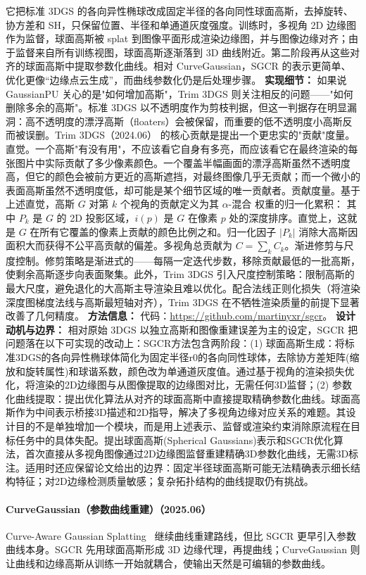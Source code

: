 它把标准 3DGS 的各向异性椭球改成固定半径的各向同性球面高斯，去掉旋转、协方差和 SH，只保留位置、半径和单通道灰度强度。训练时，多视角 2D 边缘图作为监督，球面高斯被 splat 到图像平面形成渲染边缘图，并与图像边缘对齐；由于监督来自所有训练视图，球面高斯逐渐落到 3D 曲线附近。第二阶段再从这些对齐的球面高斯中提取参数化曲线。相对 CurveGaussian，SGCR 的表示更简单、优化更像“边缘点云生成”，而曲线参数化仍是后处理步骤。
\textbf{实现细节：} 如果说 GaussianPU 关心的是"如何增加高斯"，Trim 3DGS 则关注相反的问题——"如何删除多余的高斯"。标准 3DGS 以不透明度作为剪枝判据，但这一判据存在明显漏洞：高不透明度的漂浮高斯（floaters）会被保留，而重要的低不透明度小高斯反而被误删。Trim 3DGS（2024.06） 的核心贡献是提出一个更忠实的"贡献"度量。直觉。一个高斯"有没有用"，不应该看它自身有多亮，而应该看它在最终渲染的每张图片中实际贡献了多少像素颜色。一个覆盖半幅画面的漂浮高斯虽然不透明度高，但它的颜色会被前方更近的高斯遮挡，对最终图像几乎无贡献；而一个微小的表面高斯虽然不透明度低，却可能是某个细节区域的唯一贡献者。贡献度量。基于上述直觉，高斯 $G$ 对第 $k$ 个视角的贡献定义为其 $\alpha$-混合 权重的归一化累积： 其中 $P_k$ 是 $G$ 的 2D 投影区域，$i(p)$ 是 $G$ 在像素 $p$ 处的深度排序。直觉上，这就是 $G$ 在所有它覆盖的像素上贡献的颜色比例之和。归一化因子 $|P_k|$ 消除大高斯因面积大而获得不公平高贡献的偏差。多视角总贡献为 $C = \sum_k C_k$。渐进修剪与尺度控制。修剪策略是渐进式的——每隔一定迭代步数，移除贡献最低的一批高斯，使剩余高斯逐步向表面聚集。此外，Trim 3DGS 引入尺度控制策略：限制高斯的最大尺度，避免退化的大高斯主导渲染且难以优化。配合法线正则化损失（将渲染深度图梯度法线与高斯最短轴对齐），Trim 3DGS 在不牺牲渲染质量的前提下显著改善了几何精度。
\textbf{方法信息：} 代码：\url{https://github.com/martinyxr/sgcr}。
\textbf{设计动机与边界：} 相对原始 3DGS 以独立高斯和图像重建误差为主的设定，SGCR 把问题落在以下可实现的改动上：SGCR方法包含两阶段：(1) 球面高斯生成：将标准3DGS的各向异性椭球体简化为固定半径r0的各向同性球体，去除协方差矩阵(缩放和旋转属性)和球谐系数，颜色改为单通道灰度值。通过基于视角的渲染损失优化，将渲染的2D边缘图与从图像提取的边缘图对比，无需任何3D监督；(2) 参数化曲线提取：提出优化算法从对齐的球面高斯中直接提取精确参数化曲线。球面高斯作为中间表示桥接3D描述和2D指导，解决了多视角边缘对应关系的难题。其设计目的不是单独增加一个模块，而是用上述表示、监督或渲染约束消除原流程在目标任务中的具体失配。提出球面高斯(Spherical Gaussians)表示和SGCR优化算法，首次直接从多视角图像通过2D边缘图监督重建精确3D参数化曲线，无需3D标注。适用时还应保留论文给出的边界：固定半径球面高斯可能无法精确表示细长结构特征；对2D边缘检测质量敏感；复杂拓扑结构的曲线提取仍有挑战。
\paragraph{CurveGaussian（参数曲线重建）（2025.06）}
Curve-Aware Gaussian Splatting~\cite{2506_21401} 继续曲线重建路线，但比 SGCR 更早引入参数曲线本身。SGCR 先用球面高斯形成 3D 边缘代理，再提曲线；CurveGaussian 则让曲线和边缘高斯从训练一开始就耦合，使输出天然是可编辑的参数曲线。

